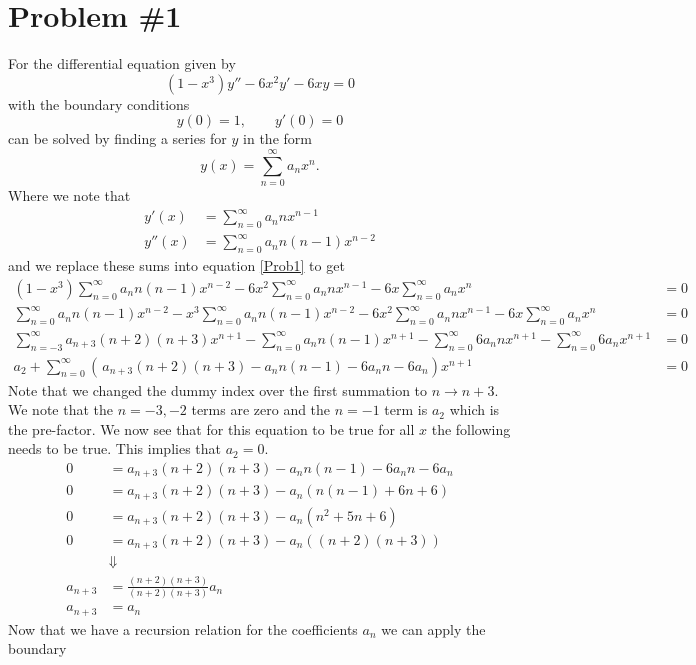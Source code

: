 \documentclass[11pt]{article}
\numberwithin{equation}{section}
\begin{document}


\section{Problem \#1}
For the differential equation given by
\begin{equation}
(1-x^3)y''-6x^2y'-6xy=0
\label{Prob1}
\end{equation}
with the boundary conditions
$$y(0)=1,\qquad y'(0)=0$$
can be solved by finding a series for $y$ in the form
$$y(x) = \sum_{n=0}^{\infty}a_nx^n.$$
Where we note that
\begin{align*}
y'(x) &= \sum_{n=0}^{\infty}a_nnx^{n-1}\\
y''(x) &= \sum_{n=0}^{\infty}a_nn(n-1)x^{n-2}
\end{align*}
and we replace these sums into equation \ref{Prob1} to get
\begin{align*}
(1-x^3)\sum_{n=0}^{\infty}a_nn(n-1)x^{n-2} - 6x^2\sum_{n=0}^{\infty}a_nnx^{n-1} - 6x\sum_{n=0}^{\infty}a_nx^n &= 0\\
\sum_{n=0}^{\infty}a_nn(n-1)x^{n-2}-x^3\sum_{n=0}^{\infty}a_nn(n-1)x^{n-2} - 6x^2\sum_{n=0}^{\infty}a_nnx^{n-1} - 6x\sum_{n=0}^{\infty}a_nx^n &= 0\\
\sum_{n=-3}^{\infty}a_{n+3}(n+2)(n+3)x^{n+1}-\sum_{n=0}^{\infty}a_nn(n-1)x^{n+1} - \sum_{n=0}^{\infty}6a_nnx^{n+1} - \sum_{n=0}^{\infty}6a_nx^{n+1} &= 0\\
a_2 + \sum_{n=0}^{\infty}\left(\frac{}{}a_{n+3}(n+2)(n+3)-a_nn(n-1)-6a_nn-6a_n\right)x^{n+1} &= 0
\end{align*}
Note that we changed the dummy index over the first summation to $n\rightarrow n+3$. We note 
that the $n=-3,-2$ terms are zero and the $n=-1$ term is $a_2$ which is the pre-factor. We
now see that for this equation to be true for all $x$ the following needs to be true. This 
implies that $a_2=0$.
\begin{align*}
0 &= a_{n+3}(n+2)(n+3)-a_nn(n-1)-6a_nn-6a_n\\
0 &= a_{n+3}(n+2)(n+3)-a_n(n(n-1)+6n+6)\\
0 &= a_{n+3}(n+2)(n+3)-a_n(n^2+5n+6)\\
0 &= a_{n+3}(n+2)(n+3)-a_n((n+2)(n+3))\\
&\Downarrow\\
a_{n+3} &= \frac{(n+2)(n+3)}{(n+2)(n+3)}a_n\\
a_{n+3} &= a_n
\end{align*}
Now that we have a recursion relation for the coefficients $a_n$ we can apply the boundary
\end{document}
